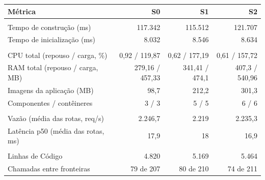 \begin{quadro}[htb]
  \centering
  \caption{E-commerce --- métricas por snapshot --- Capacidade de Negócio.}
  \label{qua:comp_ecommerce_capacidade-negocio_snapshots}
  \renewcommand{\arraystretch}{1.15}
  \begin{tabularx}{\textwidth}{|>{\raggedright\arraybackslash}X|r|r|r|}
    \hline
    \textbf{Métrica} & \textbf{S0} & \textbf{S1} & \textbf{S2} \\
    \hline
    \multicolumn{4}{|l|}{\textbf{Agilidade}} \\
    \hline
    Tempo de construção (ms) & 117.342 & 115.512 & 121.707 \\
    Tempo de inicialização (ms) & 8.032 & 8.546 & 8.634 \\
    \hline
    \multicolumn{4}{|l|}{\textbf{Custo}} \\
    \hline
    CPU total (repouso / carga, \%) & 0,92 / 119,87 & 0,62 / 177,19 & 0,61 / 157,72 \\
    RAM total (repouso / carga, MB) & 279,16 / 457,33 & 341,41 / 474,1 & 407,3 / 540,96 \\
    Imagens da aplicação (MB) & 98,7 & 212,2 & 301,3 \\
    Componentes / contêineres & 3 / 3 & 5 / 5 & 6 / 6 \\
    \hline
    \multicolumn{4}{|l|}{\textbf{Desempenho}} \\
    \hline
    Vazão (média das rotas, req/s) & 2.246,7 & 2.219 & 2.235,3 \\
    Latência p50 (média das rotas, ms) & 17,9 & 18 & 16,9 \\
    \hline
    \multicolumn{4}{|l|}{\textbf{Manutenibilidade}} \\
    \hline
    Linhas de Código & 4.820 & 5.169 & 5.464 \\
    Chamadas entre fronteiras & 79 de 207 & 80 de 210 & 74 de 211 \\
    \hline
  \end{tabularx}
\end{quadro}
